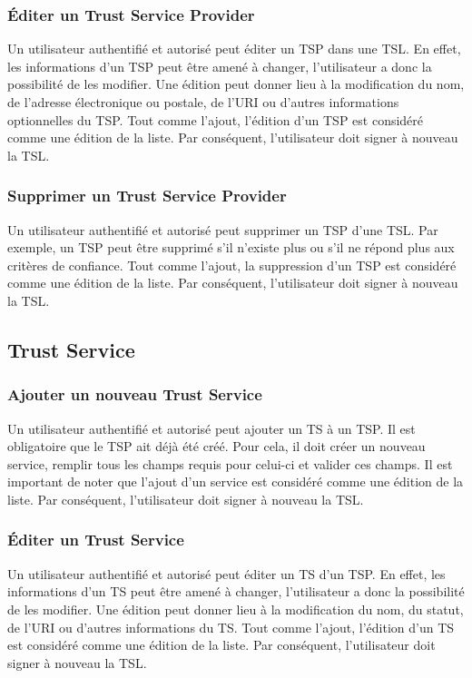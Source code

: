 \documentclass{tnreport}
\begin{document}
\subsubsection{Éditer un Trust Service Provider}
Un utilisateur authentifié et autorisé peut éditer un TSP dans une TSL. En effet, les informations d'un TSP peut être amené à changer, l'utilisateur a donc la possibilité de les modifier. Une édition peut donner lieu à la modification du nom, de l'adresse électronique ou postale, de l'URI ou d'autres informations optionnelles du TSP. Tout comme l'ajout, l'édition d'un TSP est considéré comme une édition de la liste. Par conséquent, l'utilisateur doit signer à nouveau la TSL.
\subsubsection{Supprimer un Trust Service Provider}
Un utilisateur authentifié et autorisé peut supprimer un TSP d'une TSL. Par exemple, un TSP peut être supprimé s'il n'existe plus ou s'il ne répond plus aux critères de confiance. Tout comme l'ajout, la suppression d'un TSP est considéré comme une édition de la liste. Par conséquent, l'utilisateur doit signer à nouveau la TSL.

\subsection{Trust Service}
\subsubsection{Ajouter un nouveau Trust Service}
Un utilisateur authentifié et autorisé peut ajouter un TS à un TSP. Il est obligatoire que le TSP ait déjà été créé. Pour cela, il doit créer un nouveau service, remplir tous les champs requis pour celui-ci et valider ces champs. Il est important de noter que l'ajout d'un service est considéré comme une édition de la liste. Par conséquent, l'utilisateur doit signer à nouveau la TSL.
\subsubsection{Éditer un Trust Service}
Un utilisateur authentifié et autorisé peut éditer un TS d'un TSP. En effet, les informations d'un TS peut être amené à changer, l'utilisateur a donc la possibilité de les modifier. Une édition peut donner lieu à la modification du nom, du statut, de l'URI ou d'autres informations du TS. Tout comme l'ajout, l'édition d'un TS est considéré comme une édition de la liste. Par conséquent, l'utilisateur doit signer à nouveau la TSL.
\end{document}
